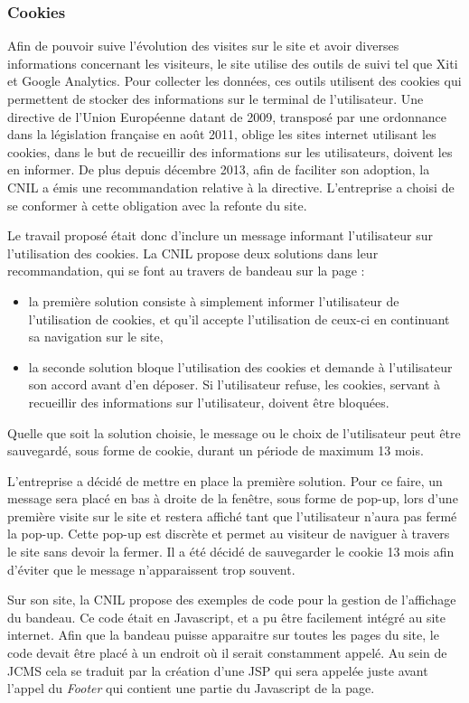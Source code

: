 \documentclass[12pt,a4paper]{article}
\begin{document}
\newpage
\subsubsection{Cookies}
Afin de pouvoir suive l'évolution des visites sur le site et avoir diverses informations concernant les visiteurs, le site utilise des outils de suivi tel que Xiti et Google Analytics. Pour collecter les données, ces outils utilisent des cookies qui permettent de stocker des informations sur le terminal de l'utilisateur. Une directive de l'Union Européenne datant de 2009, transposé par une ordonnance dans la législation française en août 2011, oblige les sites internet utilisant les cookies, dans le but de recueillir des informations sur les utilisateurs, doivent les en informer. De plus depuis décembre 2013, afin de faciliter son adoption, la CNIL a émis une recommandation relative à la directive. L'entreprise a choisi de se conformer à cette obligation avec la refonte du site.\par 
Le travail proposé était donc d'inclure un message informant l'utilisateur sur l'utilisation des cookies. La CNIL propose deux solutions dans leur recommandation, qui se font au travers de bandeau sur la page :
\begin{itemize}
\item la première solution consiste à simplement informer l'utilisateur de l'utilisation de cookies, et qu'il accepte l'utilisation de ceux-ci en continuant sa navigation sur le site,
\item la seconde solution bloque l'utilisation des cookies et demande à l'utilisateur son accord avant d'en déposer. Si l'utilisateur refuse, les cookies, servant à recueillir des informations sur l'utilisateur, doivent être bloquées.
\end{itemize}\par 
Quelle que soit la solution choisie, le message ou le choix de l'utilisateur peut être sauvegardé, sous forme de cookie, durant un période de maximum 13 mois.\par 
\bigskip
L'entreprise a décidé de mettre en place la première solution. Pour ce faire, un message sera placé en bas à droite de la fenêtre, sous forme de pop-up, lors d'une première visite sur le site et restera affiché tant que l'utilisateur n'aura pas fermé la pop-up. Cette pop-up est discrète et permet au visiteur de naviguer à travers le site sans devoir la fermer. Il a été décidé de sauvegarder le cookie 13 mois afin d'éviter que le message n'apparaissent trop souvent.\par 
Sur son site, la CNIL propose des exemples de code pour la gestion de l'affichage du bandeau. Ce code était en Javascript, et a pu être facilement intégré au site internet. Afin que la bandeau puisse apparaitre sur toutes les pages du site, le code devait être placé à un endroit où il serait constamment appelé. Au sein de \gls{JCMS} cela se traduit par la création d'une JSP qui sera appelée juste avant l'appel du \textit{Footer} qui contient une partie du Javascript de la page.\par
\end{document}
